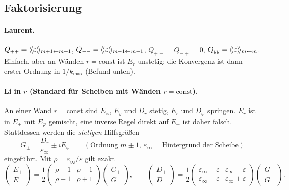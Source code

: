 \subsection{Faktorisierung}\label{sec:cylfact}
\paragraph{Laurent.} $Q_{++}=\langle\!\langle \varepsilon\rangle\!\rangle_{m+1\leftarrow m+1}$, $Q_{--}=\langle\!\langle \varepsilon\rangle\!\rangle_{m-1\leftarrow m-1}$,
$Q_{+-}=Q_{-+}=0$, $Q_{yy}=\langle\!\langle \varepsilon\rangle\!\rangle_{m\leftarrow m}$. Einfach, aber an Wänden $r=\text{const}$ ist $E_r$ unstetig;
die Konvergenz ist dann erster Ordnung in $1/k_{\max}$ (Befund unten).

\paragraph{Li in $r$ (Standard für Scheiben mit Wänden $r=\text{const}$).} An einer Wand $r=\text{const}$ sind $E_\varphi$,
$E_y$ und $D_r$ stetig, $E_r$ und $D_\varphi$ springen. $E_r$ ist in $E_\pm$ mit $E_\varphi$ gemischt, eine inverse
Regel direkt auf $E_\pm$ ist daher falsch. Stattdessen werden die \emph{stetigen} Hilfsgrößen
\begin{equation}
  G_\pm=\frac{D_r}{\varepsilon_\infty}\pm iE_\varphi\qquad(\text{Ordnung }m\pm1,\ \varepsilon_\infty=\text{Hintergrund der Scheibe})
\end{equation}
eingeführt. Mit $\rho=\varepsilon_\infty/\varepsilon$ gilt exakt
\begin{equation}
  \begin{pmatrix}E_+\\E_-\end{pmatrix}=\frac12\begin{pmatrix}\rho+1&\rho-1\\\rho-1&\rho+1\end{pmatrix}\begin{pmatrix}G_+\\G_-\end{pmatrix},\qquad
  \begin{pmatrix}D_+\\D_-\end{pmatrix}=\frac12\begin{pmatrix}\varepsilon_\infty+\varepsilon&\varepsilon_\infty-\varepsilon\\\varepsilon_\infty-\varepsilon&\varepsilon_\infty+\varepsilon\end{pmatrix}
  \begin{pmatrix}G_+\\G_-\end{pmatrix}.
  \label{eq:cyl_G}
\end{equation}
